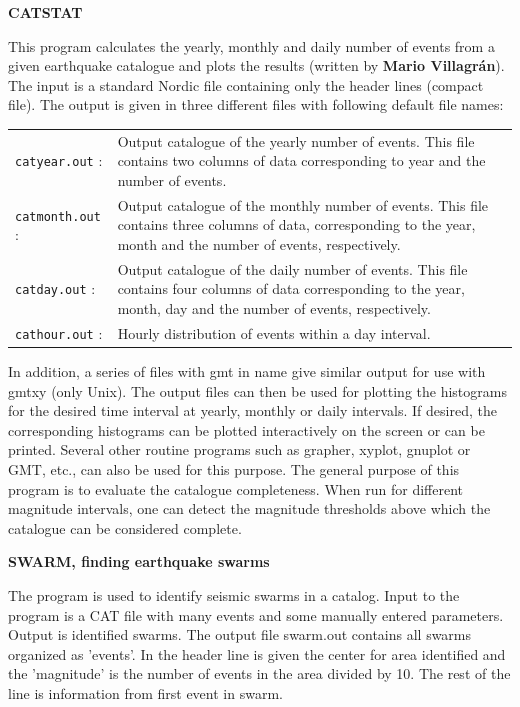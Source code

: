 \textbf{CATSTAT}

This program calculates the yearly, monthly and daily number of events from a given earthquake catalogue and plots the results (written by \textbf{Mario Villagr\'an}). The input is a standard Nordic file containing only the header lines (compact file). The output is given in three different files with following default file names: 

\begin{tabular}{lp{8cm}}
\texttt{catyear.out} \index{Catyear.out}: & Output catalogue of the yearly number of events. This file contains two columns of data corresponding to year and the number of events. \\
\texttt{catmonth.out} \index{Catmonth.out}: & Output catalogue of the monthly number of events. This file contains three columns of data, corresponding to the year, month and the number of events, respectively. \\
\texttt{catday.out} \index{Catday.out}: & Output catalogue of the daily number of events. This file contains four columns of data corresponding to the year, month, day and the number of events, respectively. \\
\texttt{cathour.out} \index{Cathour.out}\index{Cathour.out}: & Hourly distribution of events within a day interval. \\
\end{tabular}

In addition, a series of files with gmt in name give similar output for use with gmtxy (only Unix). The output files can then be used for plotting the histograms for the desired time interval at yearly, monthly or daily intervals. If desired, the corresponding histograms can be plotted interactively on the screen or can be printed. Several other routine programs such as grapher, xyplot, gnuplot or GMT, etc., can also be used for this purpose. The general purpose of this program is to evaluate the catalogue completeness. When run for different magnitude intervals, one can detect the magnitude thresholds above which the catalogue can be considered complete. 

\textbf{SWARM, finding earthquake swarms}

The program is used to identify seismic swarms in a catalog. Input to the program is a CAT file with many events and some manually entered parameters. Output is identified swarms. The output file swarm.out contains all swarms organized as 'events'. In the header line is given the center for area identified and the 'magnitude' is the number of events in the area divided by 10. The rest of the line is information from first event in swarm.                                    

